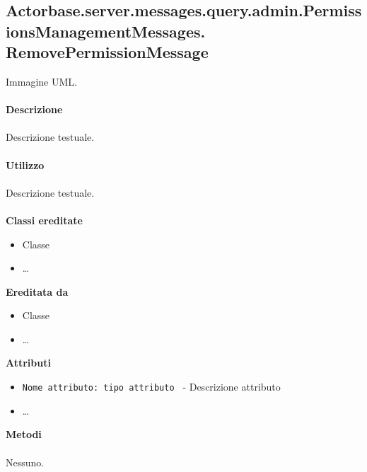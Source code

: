 \documentclass[a4paper]{article}
\begin{document}
\subsection{Actorbase.server.messages.query.admin.PermissionsManagementMessages.
\newline RemovePermissionMessage}
		Immagine UML.
		\\ \\
		\textbf{Descrizione}
			\\ \\
			Descrizione testuale.
			\\ \\
		\textbf{Utilizzo}
			\\ \\
			Descrizione testuale.
			\\ \\
		\textbf{Classi ereditate}
			\begin{itemize}
				\item Classe
				\item \dots
			\end{itemize}
		\textbf{Ereditata da}
			\begin{itemize}
				\item Classe
				\item \dots
			\end{itemize}
		\textbf{Attributi}
			\begin{itemize}
				\item \texttt{Nome attributo: tipo attributo } - Descrizione attributo
				\item \dots
			\end{itemize}
		\textbf{Metodi}
			\\ \\
			Nessuno.
			
\end{document}
